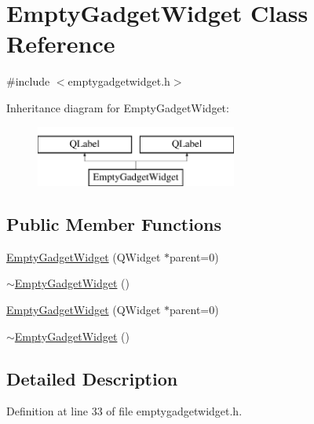 \hypertarget{class_empty_gadget_widget}{\section{Empty\-Gadget\-Widget Class Reference}
\label{class_empty_gadget_widget}
}


{\ttfamily \#include $<$emptygadgetwidget.\-h$>$}

Inheritance diagram for Empty\-Gadget\-Widget\-:\begin{figure}[H]
\begin{center}
\leavevmode
\includegraphics[height=2.000000cm]{class_empty_gadget_widget}
\end{center}
\end{figure}
\subsection*{Public Member Functions}
\begin{DoxyCompactItemize}
\item 
\hyperlink{group___empty_gadget_plugin_ga49fd1e7c797821911cc8c1aaf39af255}{Empty\-Gadget\-Widget} (Q\-Widget $\ast$parent=0)
\item 
\hyperlink{group___empty_gadget_plugin_ga31f0094726f11e434e12aaa0a764d467}{$\sim$\-Empty\-Gadget\-Widget} ()
\item 
\hyperlink{class_empty_gadget_widget_ga49fd1e7c797821911cc8c1aaf39af255}{Empty\-Gadget\-Widget} (Q\-Widget $\ast$parent=0)
\item 
\hyperlink{class_empty_gadget_widget_ga31f0094726f11e434e12aaa0a764d467}{$\sim$\-Empty\-Gadget\-Widget} ()
\end{DoxyCompactItemize}


\subsection{Detailed Description}


Definition at line 33 of file emptygadgetwidget.\-h.




